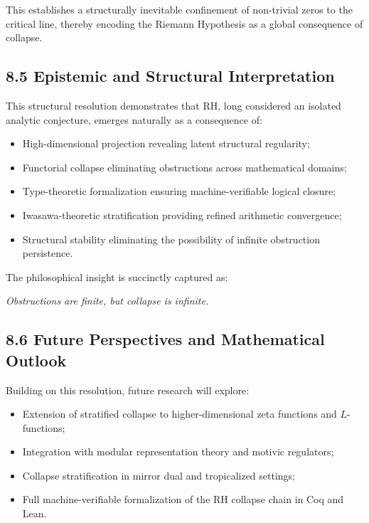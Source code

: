 \documentclass[11pt]{article}
\begin{document}
This establishes a structurally inevitable confinement of non-trivial zeros to the critical line, thereby encoding the Riemann Hypothesis as a global consequence of collapse.

\subsection*{8.5 Epistemic and Structural Interpretation}

This structural resolution demonstrates that RH, long considered an isolated analytic conjecture, emerges naturally as a consequence of:

\begin{itemize}
    \item High-dimensional projection revealing latent structural regularity;
    \item Functorial collapse eliminating obstructions across mathematical domains;
    \item Type-theoretic formalization ensuring machine-verifiable logical closure;
    \item Iwasawa-theoretic stratification providing refined arithmetic convergence;
    \item Structural stability eliminating the possibility of infinite obstruction persistence.
\end{itemize}

The philosophical insight is succinctly captured as:

\begin{center}
\textit{Obstructions are finite, but collapse is infinite.}
\end{center}

\subsection*{8.6 Future Perspectives and Mathematical Outlook}

Building on this resolution, future research will explore:

\begin{itemize}
    \item Extension of stratified collapse to higher-dimensional zeta functions and $L$-functions;
    \item Integration with modular representation theory and motivic regulators;
    \item Collapse stratification in mirror dual and tropicalized settings;
    \item Full machine-verifiable formalization of the RH collapse chain in Coq and Lean.
\end{itemize}
\end{document}

